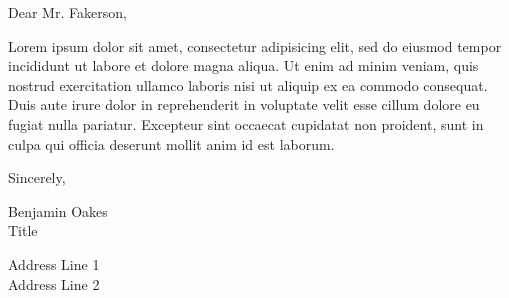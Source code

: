 \documentclass[12pt,letterpaper]{letter}
\begin{document}
Dear Mr. Fakerson,

Lorem ipsum dolor sit amet, consectetur adipisicing elit, sed do eiusmod tempor incididunt ut labore et dolore magna aliqua. Ut enim ad minim veniam, quis nostrud exercitation ullamco laboris nisi ut aliquip ex ea commodo consequat. Duis aute irure dolor in reprehenderit in voluptate velit esse cillum dolore eu fugiat nulla pariatur. Excepteur sint occaecat cupidatat non proident, sunt in culpa qui officia deserunt mollit anim id est laborum.

Sincerely,

\vspace{12mm}

Benjamin Oakes \\
Title

Address Line 1 \\
Address Line 2
\end{document}
